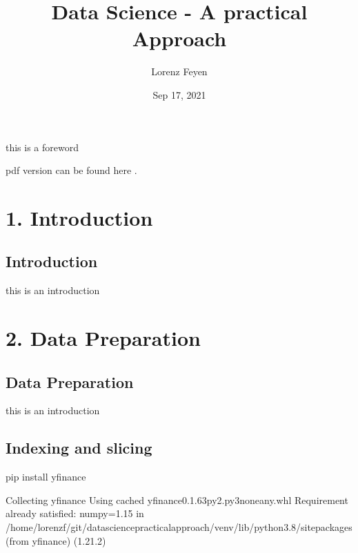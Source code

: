 \documentclass[letterpaper,10pt,english]{jupyterBook}
\title{Data Science - A practical Approach}
\date{Sep 17, 2021}
\author{Lorenz Feyen}
\begin{document}
\pagestyle{empty}
\sphinxmaketitle
\pagestyle{plain}
\sphinxtableofcontents
\pagestyle{normal}
\label{\detokenize{foreword::doc}}


\sphinxAtStartPar
this is a foreword

\sphinxAtStartPar
pdf version can be found here .


\part{1. Introduction}


\chapter{Introduction}
\label{\detokenize{c1_introduction/introduction:introduction}}\label{\detokenize{c1_introduction/introduction::doc}}
\sphinxAtStartPar
this is an introduction


\part{2. Data Preparation}


\chapter{Data Preparation}
\label{\detokenize{c2_data_preparation/introduction:data-preparation}}\label{\detokenize{c2_data_preparation/introduction::doc}}
\sphinxAtStartPar
this is an introduction


\chapter{Indexing and slicing}
\label{\detokenize{c2_data_preparation/indexing_slicing:indexing-and-slicing}}\label{\detokenize{c2_data_preparation/indexing_slicing::doc}}
\begin{sphinxVerbatim}[commandchars=\\\{\}]
pip install yfinance
   
   
\end{sphinxVerbatim}

\begin{sphinxVerbatim}[commandchars=\\\{\}]
Collecting yfinance
  Using cached yfinance\PYGZhy{}0.1.63\PYGZhy{}py2.py3\PYGZhy{}none\PYGZhy{}any.whl
Requirement already satisfied: numpy\PYGZgt{}=1.15 in /home/lorenzf/git/data\PYGZhy{}science\PYGZhy{}practical\PYGZhy{}approach/venv/lib/python3.8/site\PYGZhy{}packages (from yfinance) (1.21.2)
\end{sphinxVerbatim}
\end{document}
